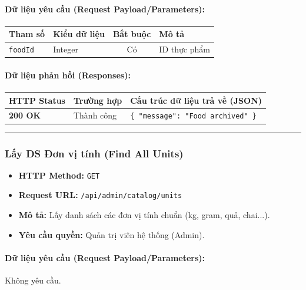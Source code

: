 \documentclass[12pt,a4paper]{article}
\begin{document}
\paragraph{Dữ liệu yêu cầu (Request Payload/Parameters):}
\begin{longtable}{|>{\raggedright\arraybackslash}p{2.8cm}|>{\raggedright\arraybackslash}p{2.2cm}|c|>{\raggedright\arraybackslash}p{7.0cm}|}
\hline
\textbf{Tham số} & \textbf{Kiểu dữ liệu} & \textbf{Bắt buộc} & \textbf{Mô tả} \\ \hline
\endhead
\texttt{foodId} & Integer & Có & ID thực phẩm \\ \hline
\end{longtable}

\paragraph{Dữ liệu phản hồi (Responses):}
\begin{longtable}{|>{\raggedright\arraybackslash}p{2.8cm}|>{\raggedright\arraybackslash}p{3.2cm}|>{\raggedright\arraybackslash}p{8.0cm}|}
\hline
\textbf{HTTP Status} & \textbf{Trường hợp} & \textbf{Cấu trúc dữ liệu trả về (JSON)} \\ \hline
\endhead
\textbf{200 OK} & Thành công & \texttt{\{ "message": "Food archived" \}} \\ \hline
\end{longtable}

\vskip 0.4cm
\noindent\rule{\textwidth}{0.3pt}
\vskip 0.4cm

\subsubsection{Lấy DS Đơn vị tính (Find All Units)}
\begin{itemize}[leftmargin=*]
    \item \textbf{HTTP Method:} \texttt{GET}
    \item \textbf{Request URL:} \texttt{/api/admin/catalog/units}
    \item \textbf{Mô tả:} Lấy danh sách các đơn vị tính chuẩn (kg, gram, quả, chai...).
    \item \textbf{Yêu cầu quyền:} Quản trị viên hệ thống (Admin).
\end{itemize}

\paragraph{Dữ liệu yêu cầu (Request Payload/Parameters):}
Không yêu cầu.\\
\end{document}
